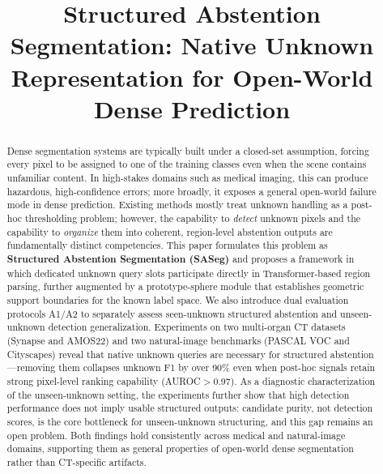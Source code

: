 \documentclass[journal]{IEEEtai}
\begin{document}
\title{Structured Abstention Segmentation: Native Unknown Representation for Open-World Dense Prediction}

\author{}


\maketitle

\begin{abstract}
Dense segmentation systems are typically built under a closed-set assumption,
forcing every pixel to be assigned to one of the training classes even when the scene
contains unfamiliar content. In high-stakes domains such as medical imaging, this can
produce hazardous, high-confidence errors; more broadly, it exposes a general open-world
failure mode in dense prediction. Existing methods mostly treat unknown handling as a
post-hoc thresholding problem; however, the capability to \emph{detect} unknown pixels
and the capability to \emph{organize} them into coherent, region-level abstention outputs
are fundamentally distinct competencies. This paper formulates this problem as
\textbf{Structured Abstention Segmentation (SASeg)} and proposes a framework in which
dedicated unknown query slots participate directly in Transformer-based region parsing,
further augmented by a prototype-sphere module that establishes geometric support
boundaries for the known label space. We also introduce dual evaluation protocols A1/A2
to separately assess seen-unknown structured abstention and unseen-unknown detection
generalization. Experiments on two multi-organ CT datasets (Synapse and AMOS22) and two
natural-image benchmarks (PASCAL VOC and Cityscapes) reveal that native unknown queries
are necessary for structured abstention---removing them collapses unknown F1 by over
90\% even when post-hoc signals retain strong pixel-level ranking capability
(AUROC$>$0.97). As a diagnostic characterization of the unseen-unknown setting, the
experiments further show that high detection performance does not imply usable structured
outputs: candidate purity, not detection scores, is the core bottleneck for
unseen-unknown structuring, and this gap remains an open problem. Both findings hold
consistently across medical and natural-image domains, supporting them as general
properties of open-world dense segmentation rather than CT-specific artifacts.
\end{abstract}
\end{document}
